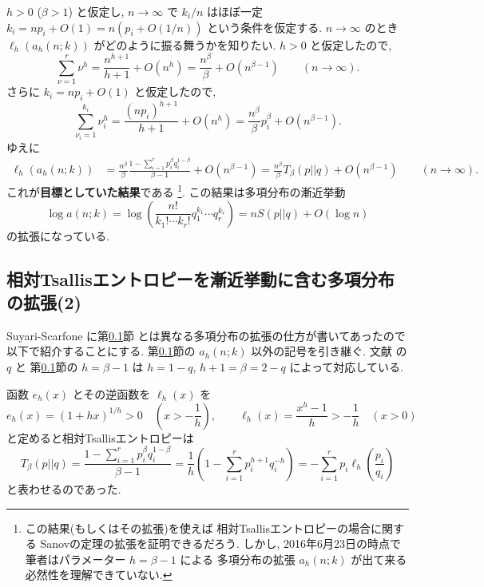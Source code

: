 \documentclass[12pt,twoside]{jarticle}
\theoremstyle{definition} %
\theoremstyle{definition} %
\theoremstyle{definition} %
\numberwithin{theorem}{section}
\numberwithin{equation}{section}
\numberwithin{figure}{section}
\numberwithin{table}{section}
\newcommand\secref[1]{第\ref{#1}節}
\begin{document}
$h>0$ ($\beta>1$) と仮定し, 
$n\to\infty$ で $k_i/n$ はほぼ一定 $k_i=n p_i + O(1)=n(p_i+O(1/n))$ という条件を仮定する.
$n\to\infty$ のとき $\ell_h(a_h(n;k))$ がどのように振る舞うかを知りたい.
$h>0$ と仮定したので, 
\[
\sum_{\nu=1}^r \nu^h 
= \frac{n^{h+1}}{h+1} + O(n^h)
= \frac{n^\beta}{\beta} + O(n^{\beta-1})
\qquad (n\to\infty).
\]
さらに $k_i=np_i+O(1)$ と仮定したので, 
\[
\sum_{\nu_i=1}^{k_i}\nu_i^h 
= \frac{(np_i)^{h+1}}{h+1} + O(n^h)
= \frac{n^\beta}{\beta}p_i^\beta+ O(n^{\beta-1}).
\]
ゆえに
\begin{align*}
\ell_h(a_h(n;k))
&
=\frac{n^\beta}{\beta}\frac{1-\sum_{i=1}^r p_i^\beta q_i^{1-\beta}}{\beta-1}
+ O(n^{\beta-1})
=\frac{n^\beta}{\beta} T_\beta(p||q) + O(n^{\beta-1})
\qquad(n\to\infty).
\end{align*}
これが{\bf 目標としていた結果}である%
\footnote{この結果(もしくはその拡張)を使えば
相対Tsallisエントロピーの場合に関する
Sanovの定理の拡張を証明できるだろう.
しかし, 2016年6月23日の時点で筆者はパラメーター $h=\beta-1$ による
多項分布の拡張 $a_h(n;k)$ が出て来る必然性を理解できていない.}. 
この結果は多項分布の漸近挙動
\[
\log a(n;k)
= \log\left( \frac{n!}{k_1!\cdots k_r!}q_1^{k_1}\cdots q_r^{k_r} \right)
= n S(p||q) + O(\log n)
\]
の拡張になっている.



\subsection{相対Tsallisエントロピーを漸近挙動に含む多項分布の拡張(2)}
\label{sec:Tsallis-multinomial-2}

Suyari-Scarfone \cite{Sutari-Scarfone} に\secref{sec:Tsallis-multinomial-2}
とは異なる多項分布の拡張の仕方が書いてあったので以下で紹介することにする.
\secref{sec:Tsallis-multinomial-2}の $a_h(n;k)$ 以外の記号を引き継ぐ. 
文献 \cite{Sutari-Scarfone} の $q$ と
\secref{sec:Tsallis-multinomial-2}の $h=\beta-1$ は $h=1-q$, $h+1=\beta=2-q$
によって対応している.

函数 $e_h(x)$ とその逆函数を $\ell_h(x)$ を
\[
e_h(x)=(1+hx)^{1/h}>0 \quad \left(x>-\frac{1}{h}\right), \qquad 
\ell_h(x)=\frac{x^h-1}{h}>-\frac{1}{h} \quad (x>0)
\]
と定めると相対Tsallisエントロピーは
\[
T_\beta(p||q)
= \frac{1-\sum_{i=1}^r p_i^\beta q_i^{1-\beta}}{\beta-1}
= \frac{1}{h}\left(1-\sum_{i=1}^r p_i^{h+1}q_i^{-h}\right) 
= - \sum_{i=1}^r p_i\ell_h\left(\frac{p_i}{q_i}\right)
\]
と表わせるのであった.
\end{document}
